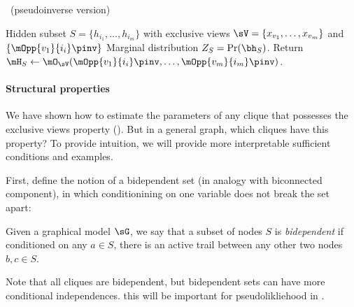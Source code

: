 
\begin{algorithm}
  \caption{\LearnClique~(pseudoinverse version)}
  \label{algo:learnclique}
  \begin{algorithmic}
    \REQUIRE Hidden subset $S = \{ h_{i_1}, \dots, h_{i_m} \}$ with exclusive views $\sV = \{ x_{v_1}, \dots, x_{v_m} \}$ and $\{\mOpp{v_1}{i_i}\pinv\}$ %
    \ENSURE Marginal distribution $Z_S = \Pr(\bh_S)$.
      \STATE Return $\mH_S \gets \mO_{\sV}( \mOpp{v_1}{i_i}\pinv, \dots, {\mOpp{v_m}{i_m}}\pinv )$.
  \end{algorithmic}
\end{algorithm}

\paragraph{Structural properties}

We have shown how to estimate the parameters of any clique that possesses the exclusive
  views property ().
  But in a general graph, which cliques have this property?
  To provide intuition, we will provide more interpretable sufficient conditions
  and examples.

First, define the notion of a bidependent set (in analogy with biconnected component),
in which conditionining on one variable does not break the set apart:
\begin{definition}
Given a graphical model $\sG$, we say that a subset of nodes $S$ is \emph{bidependent} if
conditioned on any $a \in S$, there is an active trail between any other two nodes $b,c \in S$.
\end{definition}
Note that all cliques are bidependent, but bidependent sets can have more conditional independences.
this will be important for pseudolikliehood in .

